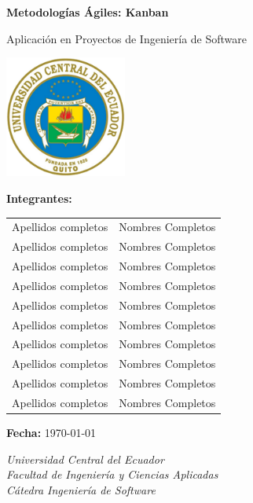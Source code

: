 \begin{titlepage}
    \centering
    \vspace*{1.5cm}
    
    {\LARGE\bfseries Metodologías Ágiles: Kanban \par}
    \vspace{0.5cm}
    {\large Aplicación en Proyectos de Ingeniería de Software \par}
    
    \vspace{0.8cm}
    \includegraphics[width=0.3\textwidth]{assets/icons/logo-UCE.png}
    \vspace{0.5cm}
    
    \vfill
    
    {\normalsize \textbf{Integrantes:} \par}
    \vspace{0.3cm}
    \begin{minipage}{0.7\textwidth}
    \centering
    \begin{tabular}{ll}
        Apellidos completos & Nombres Completos \\
        Apellidos completos & Nombres Completos \\
        Apellidos completos & Nombres Completos \\
        Apellidos completos & Nombres Completos \\
        Apellidos completos & Nombres Completos \\
        Apellidos completos & Nombres Completos \\
        Apellidos completos & Nombres Completos \\
        Apellidos completos & Nombres Completos \\
        Apellidos completos & Nombres Completos \\
        Apellidos completos & Nombres Completos \\
    \end{tabular}
    \end{minipage}
    
    \vspace{1cm}
    {\normalsize \textbf{Fecha:} \today \par}
    \vspace{1cm}
    
    \vfill
    
    {\small\textit{Universidad Central del Ecuador \\ Facultad de Ingeniería y Ciencias Aplicadas \\ Cátedra Ingeniería de Software}}
\end{titlepage}
